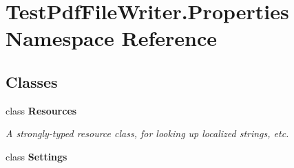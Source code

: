 \hypertarget{namespace_test_pdf_file_writer_1_1_properties}{}\section{Test\+Pdf\+File\+Writer.\+Properties Namespace Reference}
\label{namespace_test_pdf_file_writer_1_1_properties}
\subsection*{Classes}
\begin{DoxyCompactItemize}
\item 
class {\bfseries Resources}
\begin{DoxyCompactList}\small\item\em A strongly-\/typed resource class, for looking up localized strings, etc. \end{DoxyCompactList}\item 
class {\bfseries Settings}
\end{DoxyCompactItemize}
